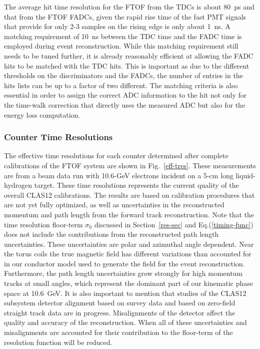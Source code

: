 \documentclass{elsart}
\begin{document}
The average hit time resolution for the FTOF from the TDCs is about 80~ps and that from the FTOF
FADCs, given the rapid rise time of the fast PMT signals that provide for only 2-3 samples on the rising
edge is only about 1~ns. A matching requirement of 10~ns between the TDC time and the FADC time is
employed during event reconstruction. While this matching requirement still needs to be tuned further,
it is already reasonably efficient at allowing the FADC hits to be matched with the TDC hits. This is
important as due to the different thresholds on the discriminators and the FADCs, the number of
entries in the hits lists can be up to a factor of two different. The matching criteria is also essential in
order to assign the correct ADC information to the hit not only for the time-walk correction that directly
uses the measured ADC but also for the energy loss computation.

\subsubsection{Counter Time Resolutions}
\label{tres-beam}

The effective time resolutions for each counter determined after complete calibrations of the FTOF
system are shown in Fig.~\ref{eff-tres}. These measurements are from a beam data run with 10.6-GeV
electrons incident on a 5-cm long liquid-hydrogen target. These time resolutions represents the current
quality of the overall CLAS12 calibrations. The results are based on calibration procedures that are not
yet fully optimized, as well as uncertainties in the reconstructed momentum and path length from the
forward track reconstruction. Note that the time resolution floor-term $\sigma_0$ discussed in
Section~\ref{res-sec} and Eq.(\ref{timing-func}) does not include the contributions from the
reconstructed path length uncertainties. These uncertainties are polar and azimuthal angle dependent.
Near the torus coils the true magnetic field has different variations than accounted for in our conductor
model used to generate the field for the event reconstruction. Furthermore, the path length uncertainties
grow strongly for high momentum tracks at small angles, which represent the dominant part of our kinematic
phase space at 10.6~GeV. It is also important to mention that studies of the CLAS12 subsystem detector
alignment based on survey data and based on zero-field straight track data are in progress. Misalignments
of the detector affect the quality and accuracy of the reconstruction. When all of these uncertainties and
misalignments are accounted for their contribution to the floor-term of the resolution function will be
reduced.
\end{document}
